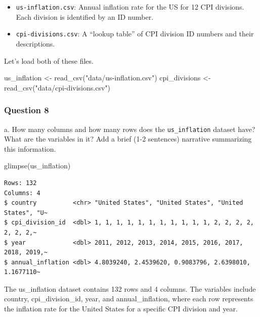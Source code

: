 \documentclass[
  letterpaper,
  DIV=11,
  numbers=noendperiod]{scrartcl}
\newenvironment{Shaded}{\begin{snugshade}}{\end{snugshade}}
\newcommand{\FunctionTok}[1]{\textcolor[rgb]{0.28,0.35,0.67}{#1}}
\newcommand{\NormalTok}[1]{\textcolor[rgb]{0.00,0.23,0.31}{#1}}
\newcommand{\OtherTok}[1]{\textcolor[rgb]{0.00,0.23,0.31}{#1}}
\newcommand{\StringTok}[1]{\textcolor[rgb]{0.13,0.47,0.30}{#1}}
\providecommand{\tightlist}{%
  \setlength{\itemsep}{0pt}\setlength{\parskip}{0pt}}
\begin{document}
\begin{itemize}
\tightlist
\item
  \texttt{us-inflation.csv}: Annual inflation rate for the US for 12 CPI
  divisions. Each division is identified by an ID number.
\item
  \texttt{cpi-divisions.csv}: A ``lookup table'' of CPI division ID
  numbers and their descriptions.
\end{itemize}

Let's load both of these files.

\begin{Shaded}
\begin{Highlighting}[]
\NormalTok{us\_inflation }\OtherTok{\textless{}{-}} \FunctionTok{read\_csv}\NormalTok{(}\StringTok{"data/us{-}inflation.csv"}\NormalTok{)}
\NormalTok{cpi\_divisions }\OtherTok{\textless{}{-}} \FunctionTok{read\_csv}\NormalTok{(}\StringTok{"data/cpi{-}divisions.csv"}\NormalTok{)}
\end{Highlighting}
\end{Shaded}

\subsubsection{Question 8}\label{question-8}

a. How many columns and how many rows does the \texttt{us\_inflation}
dataset have? What are the variables in it? Add a brief (1-2 sentences)
narrative summarizing this information.

\begin{Shaded}
\begin{Highlighting}[]
\FunctionTok{glimpse}\NormalTok{(us\_inflation)}
\end{Highlighting}
\end{Shaded}

\begin{verbatim}
Rows: 132
Columns: 4
$ country          <chr> "United States", "United States", "United States", "U~
$ cpi_division_id  <dbl> 1, 1, 1, 1, 1, 1, 1, 1, 1, 1, 1, 2, 2, 2, 2, 2, 2, 2,~
$ year             <dbl> 2011, 2012, 2013, 2014, 2015, 2016, 2017, 2018, 2019,~
$ annual_inflation <dbl> 4.8039240, 2.4539620, 0.9083796, 2.6398010, 1.1677110~
\end{verbatim}

The us\_inflation dataset contains 132 rows and 4 columns. The variables
include country, cpi\_division\_id, year, and annual\_inflation, where
each row represents the inflation rate for the United States for a
specific CPI division and year.
\end{document}
